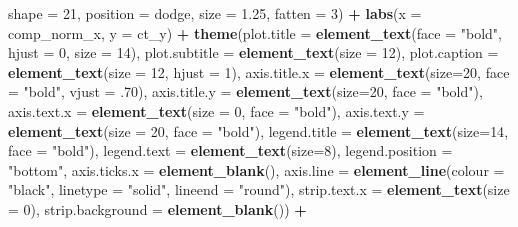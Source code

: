 \documentclass[
]{article}
\newenvironment{Shaded}{\begin{snugshade}}{\end{snugshade}}
\newcommand{\DataTypeTok}[1]{\textcolor[rgb]{0.13,0.29,0.53}{#1}}
\newcommand{\DecValTok}[1]{\textcolor[rgb]{0.00,0.00,0.81}{#1}}
\newcommand{\FloatTok}[1]{\textcolor[rgb]{0.00,0.00,0.81}{#1}}
\newcommand{\KeywordTok}[1]{\textcolor[rgb]{0.13,0.29,0.53}{\textbf{#1}}}
\newcommand{\NormalTok}[1]{#1}
\newcommand{\OperatorTok}[1]{\textcolor[rgb]{0.81,0.36,0.00}{\textbf{#1}}}
\newcommand{\StringTok}[1]{\textcolor[rgb]{0.31,0.60,0.02}{#1}}
\begin{document}
\begin{Shaded}
\begin{Highlighting}[]
                  \DataTypeTok{shape =} \DecValTok{21}\NormalTok{, }\DataTypeTok{position =}\NormalTok{ dodge, }\DataTypeTok{size =} \FloatTok{1.25}\NormalTok{, }\DataTypeTok{fatten =} \DecValTok{3}\NormalTok{) }\OperatorTok{+}
\StringTok{  }\KeywordTok{labs}\NormalTok{(}\DataTypeTok{x =}\NormalTok{ comp_norm_x,}
       \DataTypeTok{y =}\NormalTok{ ct_y) }\OperatorTok{+}\StringTok{ }
\StringTok{  }\KeywordTok{theme}\NormalTok{(}\DataTypeTok{plot.title =} \KeywordTok{element_text}\NormalTok{(}\DataTypeTok{face =} \StringTok{"bold"}\NormalTok{, }\DataTypeTok{hjust =} \DecValTok{0}\NormalTok{, }\DataTypeTok{size =} \DecValTok{14}\NormalTok{), }
        \DataTypeTok{plot.subtitle =} \KeywordTok{element_text}\NormalTok{(}\DataTypeTok{size =} \DecValTok{12}\NormalTok{),}
        \DataTypeTok{plot.caption =} \KeywordTok{element_text}\NormalTok{(}\DataTypeTok{size =} \DecValTok{12}\NormalTok{, }\DataTypeTok{hjust =} \DecValTok{1}\NormalTok{),}
        \DataTypeTok{axis.title.x =} \KeywordTok{element_text}\NormalTok{(}\DataTypeTok{size=}\DecValTok{20}\NormalTok{, }\DataTypeTok{face =} \StringTok{"bold"}\NormalTok{, }\DataTypeTok{vjust =} \FloatTok{.70}\NormalTok{),}
        \DataTypeTok{axis.title.y =} \KeywordTok{element_text}\NormalTok{(}\DataTypeTok{size=}\DecValTok{20}\NormalTok{, }\DataTypeTok{face =} \StringTok{"bold"}\NormalTok{),}
        \DataTypeTok{axis.text.x =} \KeywordTok{element_text}\NormalTok{(}\DataTypeTok{size =} \DecValTok{0}\NormalTok{, }\DataTypeTok{face =} \StringTok{"bold"}\NormalTok{),}
        \DataTypeTok{axis.text.y =} \KeywordTok{element_text}\NormalTok{(}\DataTypeTok{size =} \DecValTok{20}\NormalTok{, }\DataTypeTok{face =} \StringTok{"bold"}\NormalTok{),}
        \DataTypeTok{legend.title =} \KeywordTok{element_text}\NormalTok{(}\DataTypeTok{size=}\DecValTok{14}\NormalTok{, }\DataTypeTok{face =} \StringTok{"bold"}\NormalTok{), }
        \DataTypeTok{legend.text =} \KeywordTok{element_text}\NormalTok{(}\DataTypeTok{size=}\DecValTok{8}\NormalTok{),}
        \DataTypeTok{legend.position =} \StringTok{"bottom"}\NormalTok{,}
        \DataTypeTok{axis.ticks.x =} \KeywordTok{element_blank}\NormalTok{(), }
        \DataTypeTok{axis.line =} \KeywordTok{element_line}\NormalTok{(}\DataTypeTok{colour =} \StringTok{"black"}\NormalTok{, }\DataTypeTok{linetype =} \StringTok{"solid"}\NormalTok{, }\DataTypeTok{lineend =} \StringTok{"round"}\NormalTok{),}
        \DataTypeTok{strip.text.x =} \KeywordTok{element_text}\NormalTok{(}\DataTypeTok{size =} \DecValTok{0}\NormalTok{),}
        \DataTypeTok{strip.background =} \KeywordTok{element_blank}\NormalTok{()) }\OperatorTok{+}\StringTok{ }

\end{Highlighting}
\end{Shaded}
\end{document}
